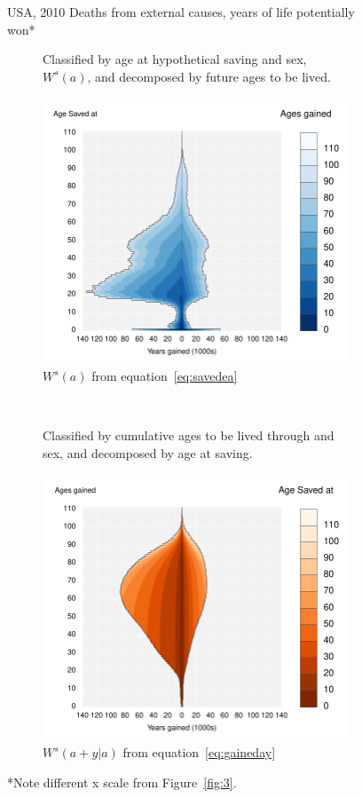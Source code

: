 \documentclass{article}
\begin{document}
\begin{figure}
\centering
\caption{USA, 2010 Deaths from external causes, years of life potentially won*}
\label{fig:4}
\begin{subfigure}[b]{.48\linewidth}
\centering
	\caption{Classified by age at hypothetical saving and sex, $W^s(a)$, and
	decomposed by future ages to be lived.}
	\label{fig:SavedGainedUSAExternal}
	\includegraphics[scale=.55]{Figures/YearsSavedGainedxx10USAExternal.pdf}
	\caption*{$W^s(a)$ from equation~\ref{eq:savedea}}	
\end{subfigure}
~
\begin{subfigure}[b]{.48\linewidth}
\centering
    \caption{Classified by cumulative ages to be lived through and sex, and
    decomposed by age at saving.}
	\label{fig:LostLivedUSAExternal}
    \includegraphics[scale=.55]{Figures/YearsLostLivedyx10USAExternal.pdf}
    \caption*{$W^s(a+y|a)$ from equation~\ref{eq:gaineday}}	
\end{subfigure}
\caption*{*Note different x scale from Figure~\ref{fig:3}.}
\end{figure}
\end{document}
